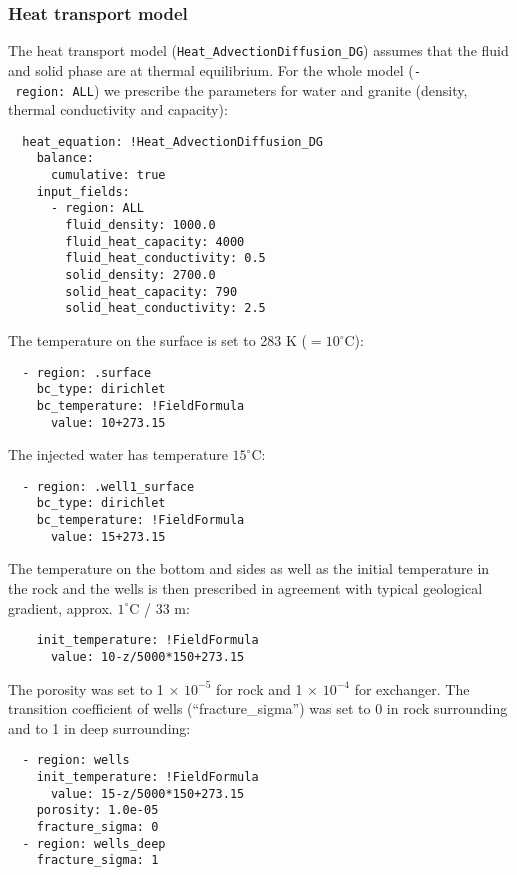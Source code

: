 \subsubsection{Heat transport model}

The heat transport model (\texttt{Heat\_AdvectionDiffusion\_DG}) assumes
that the fluid and solid phase are at thermal equilibrium. For the whole
model (\texttt{-\ region:\ ALL}) we prescribe the parameters for water
and granite (density, thermal conductivity and capacity):

\begin{verbatim}
  heat_equation: !Heat_AdvectionDiffusion_DG
    balance:
      cumulative: true
    input_fields:
      - region: ALL
        fluid_density: 1000.0
        fluid_heat_capacity: 4000
        fluid_heat_conductivity: 0.5
        solid_density: 2700.0
        solid_heat_capacity: 790
        solid_heat_conductivity: 2.5
\end{verbatim}

The temperature on the surface is set to 283 K (\(=10^\circ\)C):

\begin{verbatim}
  - region: .surface
    bc_type: dirichlet
    bc_temperature: !FieldFormula
      value: 10+273.15
\end{verbatim}

The injected water has temperature \(15^\circ\)C:

\begin{verbatim}
  - region: .well1_surface
    bc_type: dirichlet
    bc_temperature: !FieldFormula
      value: 15+273.15
\end{verbatim}

The temperature on the bottom and sides as well as the initial
temperature in the rock and the wells is then prescribed in agreement
with typical geological gradient, approx. \(1^\circ\)C / 33 m:

\begin{verbatim}
    init_temperature: !FieldFormula
      value: 10-z/5000*150+273.15
\end{verbatim}

The porosity was set to 1 \(\times\) \(10^{-5}\) for rock and 1
\(\times\) \(10^{-4}\) for exchanger. The transition coefficient of
wells (``fracture\_sigma'') was set to 0 in rock surrounding and to 1 in
deep surrounding:

\begin{verbatim}
  - region: wells
    init_temperature: !FieldFormula
      value: 15-z/5000*150+273.15
    porosity: 1.0e-05
    fracture_sigma: 0
  - region: wells_deep
    fracture_sigma: 1
\end{verbatim}

